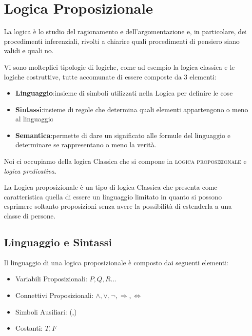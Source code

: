 \chapter{Logica Proposizionale}

La logica è lo studio	del ragionamento e dell’argomentazione e, in particolare,
dei	procedimenti inferenziali, rivolti a chiarire	quali	procedimenti di pensiero
siano	validi e quali no.

Vi sono molteplici tipologie di logiche, come ad esempio la logica classica e le logiche costruttive,
tutte accomunate di essere composte da 3 elementi:

\begin{itemize}
  \item \textbf{Linguaggio}:insieme di simboli utilizzati nella Logica per definire le cose
  \item \textbf{Sintassi}:insieme di regole che determina quali elementi appartengono o meno al linguaggio
  \item \textbf{Semantica}:permette di dare un significato alle formule del linguaggio e determinare
        se rappresentano o meno la verità.
\end{itemize}

Noi ci occupiamo della logica Classica che si compone in \textsc{logica proposizionale} e
\textit{logica predicativa}.

La Logica proposizionale è un tipo di logica Classica che presenta come caratteristica quella
di essere un linguaggio limitato in quanto si possono esprimere soltanto proposizioni senza
avere la possibilità di estenderla a una classe di persone.

\section{Linguaggio e Sintassi}
Il linguaggio di una logica proposizionale è composto dai seguenti elementi:

\begin{itemize}
  \item Variabili Proposizionali: $P,Q,R \dots$
  \item Connettivi Proposizionali: $\land, \lor, \neg, \Rightarrow, \iff$
  \item Simboli Ausiliari: (,)
  \item Costanti: $T,F$
\end{itemize}

